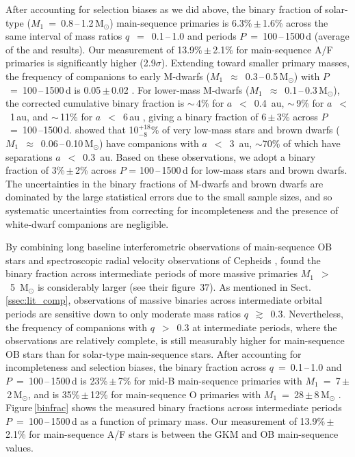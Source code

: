 \documentclass[a4paper,fleqn,usenatbib]{mnras}
\begin{document}
After accounting for selection biases as we did above, the binary fraction of solar-type ($M_1$~=~0.8\,--\,1.2\,M$_{\odot}$) main-sequence primaries is 6.3\%\,$\pm$\,1.6\% across the same interval of mass ratios $q$~$=$~0.1\,--\,1.0 and periods $P$~=~100\,--\,1500\,d (average of the \citealt{raghavanetal2010} and \citealt{moe&distefano2017} results). Our measurement of 13.9\%\,$\pm$\,2.1\% for main-sequence A/F primaries is significantly higher (2.9$\sigma$).  Extending toward smaller primary masses, the frequency of companions to early M-dwarfs ($M_1$~$\approx$~0.3\,--\,0.5\,M$_{\odot}$) with $P$~=~100\,--\,1500\,d is 0.05\,$\pm$\,0.02 \citep[][see their figure 2b]{fischer&marcy1992}. For lower-mass M-dwarfs ($M_1$~$\approx$~0.1\,--\,0.3\,M$_{\odot}$), the corrected cumulative binary fraction is $\sim$\,4\% for $a$~$<$~0.4~au, $\sim$\,9\% for $a$~$<$~1\,au, and $\sim$\,11\% for $a$~$<$~6\,au \citep{clarketal2012,guenther&wuchterl2003,joergens2006,basri&reiners2006}, giving a binary fraction of 6\,$\pm$\,3\% across $P$~=~100\,--1500\,d. \citet{joergens2008} showed that 10$^{+18}_{-8}$\% of very low-mass stars and brown dwarfs ($M_1$~$\approx$~0.06\,--\,0.10\,M$_{\odot}$) have companions with $a$~$<$~3~au, $\sim$70\% of which have separations $a$~$<$~0.3~au.  Based on these observations, we adopt a binary fraction of 3\%\,$\pm$\,2\% across $P$ = 100\,--\,1500\,d for low-mass stars and brown dwarfs.  The uncertainties in the binary fractions of M-dwarfs and brown dwarfs are dominated by the large statistical errors due to the small sample sizes, and so systematic uncertainties from correcting for incompleteness and the presence of white-dwarf companions are negligible.

By combining long baseline interferometric observations of main-sequence OB stars \citep{rizzutoetal2013,sanaetal2014} and spectroscopic radial velocity observations of Cepheids \citep{evansetal2015}, \citet{moe&distefano2017} found the binary fraction across intermediate periods of more massive primaries $M_1$~$>$~5~M$_{\odot}$ is considerably larger (see their figure~37).  As mentioned in Sect.\,\ref{ssec:lit_comp}, observations of massive binaries across intermediate orbital periods are sensitive down to only moderate mass ratios $q$~$\gtrsim$~0.3.  Nevertheless, the frequency of companions with $q$~$>$~0.3 at intermediate periods, where the observations are relatively complete, is still measurably higher for main-sequence OB stars than for solar-type main-sequence stars.  After accounting for incompleteness and selection biases, the binary fraction across $q$~=~0.1\,--\,1.0 and $P$~=~100\,--\,1500\,d is 23\%\,$\pm$\,7\% for mid-B main-sequence primaries with $M_1$~=~7\,$\pm$\,2\,M$_{\odot}$, and is 35\%\,$\pm$\,12\% for main-sequence O primaries with $M_1$~=~28\,$\pm$\,8\,M$_{\odot}$ \citep[][see their table~13]{moe&distefano2017}.  Figure\,\ref{binfrac} shows the measured binary fractions across intermediate periods $P$~=~100\,--\,1500\,d as a function of primary mass.  Our measurement of 13.9\%\,$\pm$\,2.1\% for main-sequence A/F stars is between the GKM and OB main-sequence values.
\end{document}
